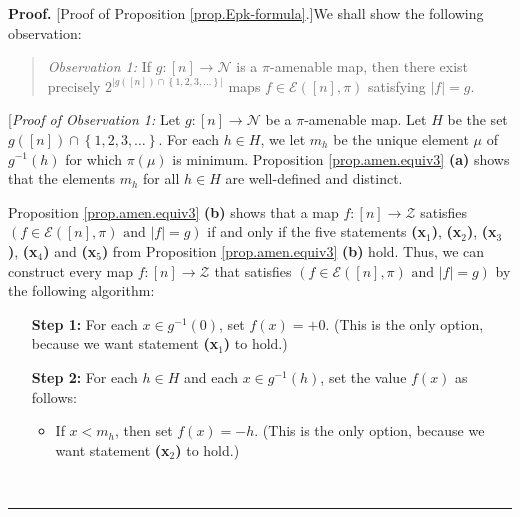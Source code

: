\documentclass[numbers=enddot,12pt,final,onecolumn,notitlepage]{scrartcl}%
\theoremstyle{definition}
\newenvironment{statement}{\begin{quote}}{\end{quote}}
\newenvironment{proof}[1][Proof]{\noindent\textbf{#1.} }{\ \rule{0.5em}{0.5em}}
\newenvironment{verlong}{}{}
\begin{document}
\begin{verlong}
\begin{proof}
[Proof of Proposition \ref{prop.Epk-formula}.]We shall show the following observation:

\begin{statement}
\textit{Observation 1:} If $g:\left[  n\right]  \rightarrow\mathcal{N}$ is a
$\pi$-amenable map, then there exist precisely $2^{\left\vert g\left(  \left[
n\right]  \right)  \cap\left\{  1,2,3,\ldots\right\}  \right\vert }$ maps
$f\in\mathcal{E}\left(  \left[  n\right]  ,\pi\right)  $ satisfying
$\left\vert f\right\vert =g$.
\end{statement}

[\textit{Proof of Observation 1:} Let $g:\left[  n\right]  \rightarrow
\mathcal{N}$ be a $\pi$-amenable map. Let $H$ be the set $g\left(  \left[
n\right]  \right)  \cap\left\{  1,2,3,\ldots\right\}  $. For each $h\in H$, we
let $m_{h}$ be the unique element $\mu$ of $g^{-1}\left(  h\right)  $ for
which $\pi\left(  \mu\right)  $ is minimum. Proposition \ref{prop.amen.equiv3}
\textbf{(a)} shows that the elements $m_{h}$ for all $h\in H$ are well-defined
and distinct.

Proposition \ref{prop.amen.equiv3} \textbf{(b)} shows that a map $f:\left[
n\right]  \rightarrow\mathcal{Z}$ satisfies $\left(  f\in\mathcal{E}\left(
\left[  n\right]  ,\pi\right)  \text{ and }\left\vert f\right\vert =g\right)
$ if and only if the five statements \textbf{(x}$_{1}$\textbf{)},
\textbf{(x}$_{2}$\textbf{)}, \textbf{(x}$_{3}$\textbf{)}, \textbf{(x}$_{4}%
$\textbf{)} and \textbf{(x}$_{5}$\textbf{)} from Proposition
\ref{prop.amen.equiv3} \textbf{(b)} hold. Thus, we can construct every map
$f:\left[  n\right]  \rightarrow\mathcal{Z}$ that satisfies $\left(
f\in\mathcal{E}\left(  \left[  n\right]  ,\pi\right)  \text{ and }\left\vert
f\right\vert =g\right)  $ by the following algorithm:

\begin{itemize}
\item[\textbf{Step 1:}] For each $x\in g^{-1}\left(  0\right)  $, set
$f\left(  x\right)  =+0$. (This is the only option, because we want statement
\textbf{(x}$_{1}$\textbf{)} to hold.)

\item[\textbf{Step 2:}] For each $h\in H$ and each $x\in g^{-1}\left(
h\right)  $, set the value $f\left(  x\right)  $ as follows:

\begin{itemize}
\item If $x<m_{h}$, then set $f\left(  x\right)  =-h$. (This is the only
option, because we want statement \textbf{(x}$_{2}$\textbf{)} to hold.)


\end{itemize}
\end{itemize}
\end{proof}
\end{verlong}
\end{document}
